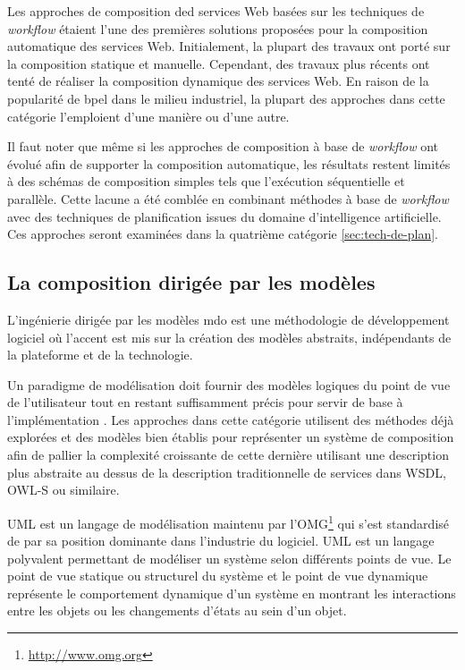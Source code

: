   Les approches de composition ded services Web basées sur les
  techniques de \textit{workflow} étaient l'une des premières solutions
  proposées pour la composition automatique des services
  Web. Initialement, la plupart des travaux ont porté sur la
  composition statique et manuelle. Cependant, des travaux plus récents
  \cite{majithia2004framework, ardagna2007paws, fujii2006semantics,
    fujii2009semantics} ont tenté de réaliser la composition
  dynamique des services Web. En raison de la popularité de
  \acrshort{bpel} dans le milieu industriel, la plupart des approches
  dans cette catégorie l'emploient d'une manière ou d'une
  autre.\medskip

  Il faut noter que même si les approches
  de composition à base de \textit{workflow} ont évolué afin de
  supporter la composition automatique, les résultats restent limités à
  des schémas de composition simples tels que l'exécution séquentielle
  et parallèle. Cette lacune a été comblée en combinant méthodes à
  base de \textit{workflow} avec des techniques de planification
  issues du domaine d'intelligence artificielle. Ces approches seront
  examinées dans la quatrième catégorie \ref{sec:tech-de-plan}.

  \subsection{La composition dirigée par les modèles}
  \label{sec:model-based-composition}
  L'ingénierie dirigée par les modèles \acrshort{mdo} est une
  méthodologie de développement logiciel où l'accent est mis sur la
  création des modèles abstraits, indépendants de la plateforme et de
  la technologie.\medskip

  Un paradigme de modélisation doit fournir des modèles logiques du
  point de vue de l'utilisateur tout en restant suffisamment précis
  pour servir de base à l'implémentation \cite{dumez2010approche}. Les
  approches dans cette catégorie utilisent des méthodes déjà explorées
  et des modèles bien établis pour représenter un système de
  composition afin de pallier la complexité croissante de cette
  dernière utilisant une description plus abstraite au dessus de la
  description traditionnelle de services dans \textsc{WSDL},
  \textsc{OWL-S} ou similaire.\medskip

  \textsc{UML} \cite{rumbaugh2004unified} est un langage de
  modélisation maintenu par
  l'\textsc{OMG}\footnote{\url{http://www.omg.org}} qui s'est
  standardisé de par sa position dominante dans l'industrie du
  logiciel. \textsc{UML} est un langage polyvalent permettant de
  modéliser un système selon différents points de vue. Le point de vue
  statique ou structurel du système et le point de vue dynamique
  représente le comportement dynamique d'un système en montrant les
  interactions entre les objets ou les changements d'états au sein
  d'un objet.\medskip


